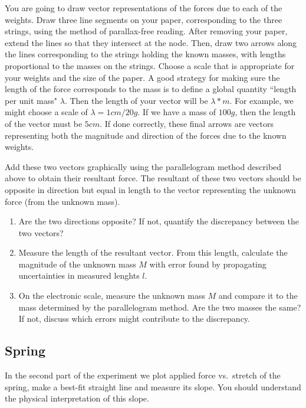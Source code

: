 You are going to draw vector representations of the forces due to each of the weights. Draw three line segments on your paper, corresponding to the three strings, using the method of parallax-free reading. After removing your paper, extend the lines so that they intersect at the node. Then, draw two arrows along the lines corresponding to the strings holding the known masses, with lengths proportional to the masses on the strings. Choose a scale that is appropriate for your weights and the size of the paper. A good strategy for making sure the length of the force corresponds to the mass is to define a global quantity ``length per unit mass" $\lambda$. Then the length of your vector will be $\lambda * m$.  For example, we might choose a scale of $\lambda = 1cm/20g$. If we have a mass of $100g$, then the length of the vector must be $5cm$. If done correctly, these final arrows are vectors representing both the magnitude and direction of the forces due to the known weights.\myskip

Add these two vectors graphically using the parallelogram method described above to obtain their resultant force. The resultant of these two vectors should be opposite in direction but equal in length to the vector representing the unknown force (from the unknown mass).

\begin{enumerate}
    \item Are the two directions opposite? If not,  quantify the discrepancy between the two vectors?
    \item Measure the length of the resultant vector. From this length, calculate the magnitude of the unknown mass $M$ with error found by propagating uncertainties in measured lenghts $l$.

\item On the electronic scale, measure the unknown mass $M$ and compare it to the mass determined by the parallelogram method. Are the two masses the  same?  If not, discuss which errors might contribute to the discrepancy.
\end{enumerate}

\subsection{Spring}

In the second part of the experiment we plot applied force vs.\ stretch of the spring, make a best-fit straight line and measure its slope. You should understand the physical interpretation of this slope. \myskip

